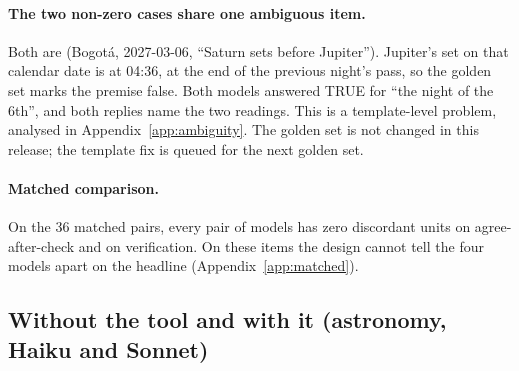 \documentclass[11pt]{article}
\DeclareRobustCommand{\code}[1]{\texttt{\detokenize{#1}}}
\newcommand{\aac}{agree-after-check}
\begin{document}
\paragraph{The two non-zero cases share one ambiguous item.}
Both are \code{sets_first-06} (Bogot\'a, 2027-03-06, ``Saturn sets before Jupiter'').
Jupiter's set on that calendar date is at 04:36, at the end of the previous night's pass, so the golden set marks the premise false.
Both models answered TRUE for ``the night of the 6th'', and both replies name the two readings.
This is a template-level problem, analysed in Appendix~\ref{app:ambiguity}.
The golden set is not changed in this release; the template fix is queued for the next golden set.

\paragraph{Matched comparison.}
On the 36 matched pairs, every pair of models has zero discordant units on \aac{} and on verification.
On these items the design cannot tell the four models apart on the headline (Appendix~\ref{app:matched}).

\subsection{Without the tool and with it (astronomy, Haiku and Sonnet)}
\label{sec:res-tool}
\end{document}
